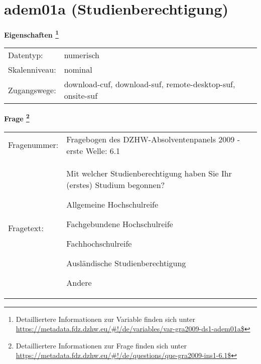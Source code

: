 
    \setcounter{footnote}{0}

    \vspace*{-1.8cm}
	\section{adem01a (Studienberechtigung)}
	\label{section:adem01a}



    \vspace*{0.5cm}
    \noindent\textbf{Eigenschaften
	\footnote{Detailliertere Informationen zur Variable finden sich unter
		\url{https://metadata.fdz.dzhw.eu/\#!/de/variables/var-gra2009-ds1-adem01a$}}}\\
	\begin{tabularx}{\hsize}{@{}lX}
	Datentyp: & numerisch \\
	Skalenniveau: & nominal \\
	Zugangswege: &
	  download-cuf, 
	  download-suf, 
	  remote-desktop-suf, 
	  onsite-suf
 \\
    \end{tabularx}



				\vspace*{0.5cm}
                \noindent\textbf{Frage
	                \footnote{Detailliertere Informationen zur Frage finden sich unter
		              \url{https://metadata.fdz.dzhw.eu/\#!/de/questions/que-gra2009-ins1-6.1$}}}\\
				\begin{tabularx}{\hsize}{@{}lX}
					Fragenummer: &
					  Fragebogen des DZHW-Absolventenpanels 2009 - erste Welle:
					  6.1
 \\
					Fragetext: & Mit welcher Studienberechtigung haben Sie Ihr (erstes) Studium begonnen?\par  Allgemeine Hochschulreife\par  Fachgebundene Hochschulreife\par  Fachhochschulreife\par  Ausländische Studienberechtigung\par  Andere \\
				\end{tabularx}





